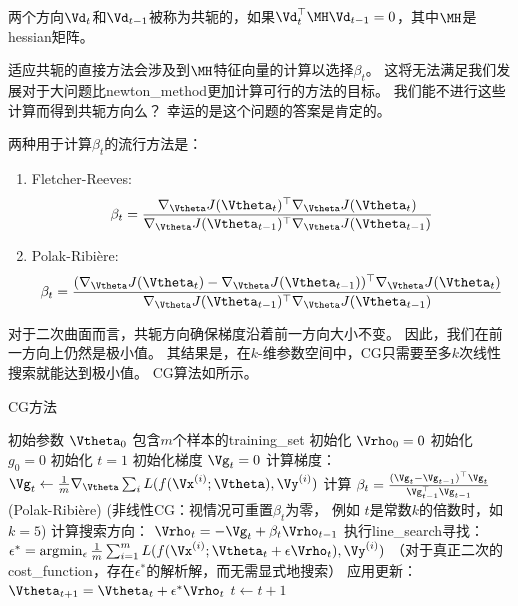 
两个方向$\Vd_t$和$\Vd_{t-1}$被称为共轭的，如果$\Vd_t^\top \MH \Vd_{t-1} = 0$，其中$\MH$是\gls{hessian}矩阵。

适应共轭的直接方法会涉及到$\MH$特征向量的计算以选择$\beta_t$。
这将无法满足我们发展对于大问题比\gls{newton_method}更加计算可行的方法的目标。
我们能不进行这些计算而得到共轭方向么？
幸运的是这个问题的答案是肯定的。

两种用于计算$\beta_t$的流行方法是：
\begin{enumerate}
\item Fletcher-Reeves:
\begin{equation}
    \beta_t = \frac{ \nabla_{\Vtheta} J(\Vtheta_t)^\top \nabla_{\Vtheta} J(\Vtheta_t) }
{ \nabla_{\Vtheta} J(\Vtheta_{t-1})^\top \nabla_{\Vtheta} J(\Vtheta_{t-1}) }
\end{equation}

\item Polak-Ribi\`{e}re:
\begin{equation}
    \beta_t = \frac{ (\nabla_{\Vtheta} J(\Vtheta_t) - \nabla_{\Vtheta} J(\Vtheta_{t-1}))^\top \nabla_{\Vtheta} J(\Vtheta_t) }
{ \nabla_{\Vtheta} J(\Vtheta_{t-1})^\top \nabla_{\Vtheta} J(\Vtheta_{t-1}) }
\end{equation}
\end{enumerate}
对于二次曲面而言，共轭方向确保梯度沿着前一方向大小不变。
因此，我们在前一方向上仍然是极小值。
其结果是，在$k$-维参数空间中，\gls{CG}只需要至多$k$次线性搜索就能达到极小值。
\gls{CG}算法如所示。

\begin{algorithm}[ht]
\caption{\gls{CG}方法}
\label{alg:cg}
\begin{algorithmic}
\REQUIRE 初始参数 $\Vtheta_{0}$
\REQUIRE 包含$m$个样本的\gls{training_set}
\STATE 初始化 $\Vrho_{0} = 0$
\STATE 初始化 $g_0 = 0$
\STATE 初始化 $t = 1$
    \STATE 初始化梯度 ${\Vg}_{t} = 0$
    \STATE 计算梯度：$\Vg_{t} \leftarrow
         \frac{1}{m}\nabla_{\Vtheta} \sum_i L(f(\Vx^{(i)};\Vtheta),\Vy^{(i)})$ 
    \STATE 计算 $\beta_{t} = \frac{(\Vg_{t}-\Vg_{t-1})^\top \Vg_{t}}{\Vg_{t-1}^\top \Vg_{t-1}}$  (Polak-Ribi\`{e}re)
    \STATE (非线性\gls{CG}：视情况可重置$\beta_{t}$为零，
           例如  $t$是常数$k$的倍数时，如 $k=5$)
    \STATE 计算搜索方向： $\Vrho_{t} = -\Vg_{t} + \beta_{t} \Vrho_{t-1}$ 
    \STATE 执行\gls{line_search}寻找：$\epsilon^{*} = \arg\!\min_{\epsilon}
    \frac{1}{m} \sum_{i=1}^{m}L(f(\Vx^{(i)};\Vtheta_t + \epsilon \Vrho_t),\Vy^{(i)})$ 
    \STATE （对于真正二次的\gls{cost_function}，存在$\epsilon^*$的解析解，而无需显式地搜索）
    \STATE 应用更新：$\Vtheta_{t+1} = \Vtheta_{t}+ \epsilon^{*} \Vrho_{t}$
    \STATE $t \leftarrow t + 1$
\ENDWHILE
\end{algorithmic}
\end{algorithm}


